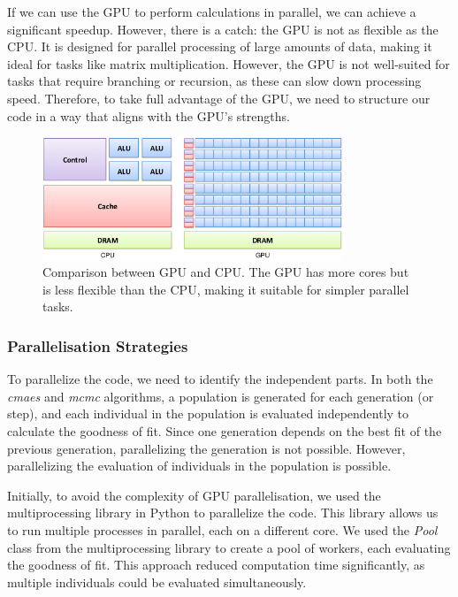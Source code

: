 \medskip

If we can use the GPU to perform calculations in parallel, we can achieve a significant speedup. However, there is a catch: the GPU is not as 
flexible as the CPU. It is designed for parallel processing of large amounts of data, making it ideal for tasks like matrix multiplication. However, 
the GPU is not well-suited for tasks that require branching or recursion, as these can slow down processing speed. Therefore, to take full advantage of 
the GPU, we need to structure our code in a way that aligns with the GPU's strengths.

\medskip

\begin{figure}[h]
    \centering
    \includegraphics[width=0.8\textwidth]{images/gpu_vs_cpu.png}
    \caption{Comparison between GPU and CPU. The GPU has more cores but is less flexible than the CPU, making it suitable for simpler parallel tasks. \cite{gpu_vs_cpu}}
\end{figure}

\subsubsection{Parallelisation Strategies}

To parallelize the code, we need to identify the independent parts. In both the \textit{cmaes} and \textit{mcmc} algorithms, a population is generated 
for each generation (or step), and each individual in the population is evaluated independently to calculate the goodness of fit. Since one generation 
depends on the best fit of the previous generation, parallelizing the generation is not possible. However, parallelizing the evaluation of individuals 
in the population is possible.

\medskip

Initially, to avoid the complexity of GPU parallelisation, we used the multiprocessing library in Python to parallelize the code. This library allows 
us to run multiple processes in parallel, each on a different core. We used the \textit{Pool} class from the multiprocessing library to create a pool 
of workers, each evaluating the goodness of fit. This approach reduced computation time significantly, as multiple individuals could be evaluated simultaneously.

